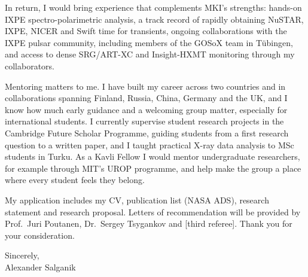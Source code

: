 \documentclass[11pt]{article}
\begin{document}
In return, I would bring experience that complements MKI's strengths: hands-on IXPE
spectro-polarimetric analysis, a track record of rapidly obtaining NuSTAR, IXPE, NICER
and Swift time for transients, ongoing collaborations with the IXPE pulsar community,
including members of the GOSoX team in T\"ubingen, and access to dense SRG/ART-XC and
Insight-HXMT monitoring through my collaborators.

Mentoring matters to me. I have built my career across two countries and in
collaborations spanning Finland, Russia, China, Germany and the UK, and I know how much
early guidance and a welcoming group matter, especially for international students. I
currently supervise student research projects in the Cambridge Future Scholar
Programme, guiding students from a first research question to a written paper, and I
taught practical X-ray data analysis to MSc students in Turku. As a Kavli Fellow I would
mentor undergraduate researchers, for example through MIT's UROP programme, and help
make the group a place where every student feels they belong.

My application includes my CV, publication list (NASA ADS), research statement and
research proposal. Letters of recommendation will be provided by Prof.~Juri Poutanen,
Dr.~Sergey Tsygankov and [third referee]. Thank you for your consideration.

Sincerely,\\[3pt]
Alexander Salganik
\end{document}
